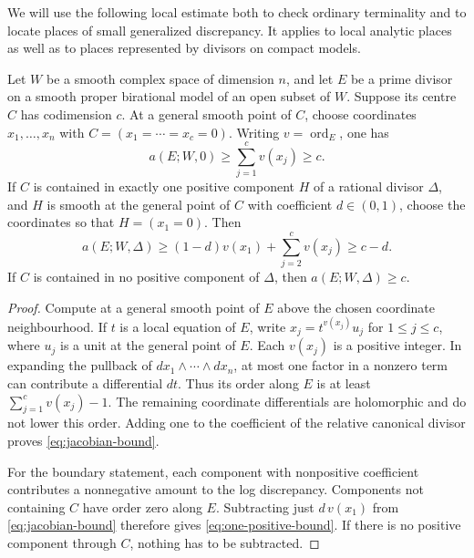 We will use the following local estimate both to check ordinary terminality
and to locate places of small generalized discrepancy.  It applies to local
analytic places as well as to places represented by divisors on compact
models.

\begin{lemma}
\label{lem:jacobian}
Let $W$ be a smooth complex space of dimension $n$, and let $E$ be a prime
divisor on a smooth proper birational model of an open subset of $W$.
Suppose its centre $C$ has codimension $c$.  At a general smooth point of
$C$, choose coordinates $x_1,\ldots,x_n$ with
$C=(x_1=\cdots=x_c=0)$.  Writing $v=\operatorname{ord}_E$, one has
\begin{equation}
 a(E;W,0)\geq\sum_{j=1}^{c}v(x_j)\geq c.
 \label{eq:jacobian-bound}
\end{equation}
If $C$ is contained in exactly one positive component $H$ of a rational
divisor $\Delta$, and $H$ is smooth at the general point of $C$ with
coefficient $d\in(0,1)$, choose the coordinates so that $H=(x_1=0)$.
Then
\begin{equation}
 a(E;W,\Delta)
 \geq (1-d)v(x_1)+\sum_{j=2}^{c}v(x_j)
 \geq c-d.
 \label{eq:one-positive-bound}
\end{equation}
If $C$ is contained in no positive component of $\Delta$, then
$a(E;W,\Delta)\geq c$.
\end{lemma}

\begin{proof}
Compute at a general smooth point of $E$ above the chosen coordinate
neighbourhood.  If $t$ is a local equation of $E$, write
$x_j=t^{v(x_j)}u_j$ for $1\leq j\leq c$, where $u_j$ is a unit at the
general point of $E$.  Each $v(x_j)$ is a positive integer.  In expanding
the pullback of $dx_1\wedge\cdots\wedge dx_n$, at most one factor in a
nonzero term can contribute a differential $dt$.  Thus its order along
$E$ is at least $\sum_{j=1}^c v(x_j)-1$.  The remaining coordinate
differentials are holomorphic and do not lower this order.  Adding one to
the coefficient of the relative canonical divisor proves
\eqref{eq:jacobian-bound}.

For the boundary statement, each component with nonpositive coefficient
contributes a nonnegative amount to the log discrepancy.  Components not
containing $C$ have order zero along $E$.  Subtracting just
$d\,v(x_1)$ from \eqref{eq:jacobian-bound} therefore gives
\eqref{eq:one-positive-bound}.  If there is no positive component through
$C$, nothing has to be subtracted.
\end{proof}

